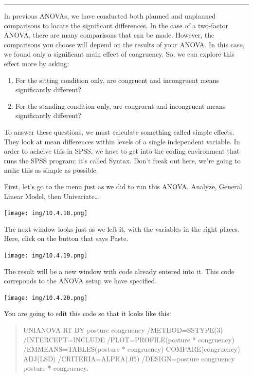 \documentclass[]{book}
\providecommand{\tightlist}{%
  \setlength{\itemsep}{0pt}\setlength{\parskip}{0pt}}
\begin{document}
\begin{center}\rule{0.5\linewidth}{0.5pt}\end{center}

In previous ANOVAs, we have conducted both planned and unplanned
comparisons to locate the significant differences. In the case of a
two-factor ANOVA, there are many comparisons that can be made. However,
the comparisons you choose will depend on the results of your ANOVA. In
this case, we found only a significant main effect of congruency. So, we
can explore this effect more by asking:

\begin{enumerate}
\def\labelenumi{\arabic{enumi}.}
\tightlist
\item
  For the sitting condition only, are congruent and incongruent means
  significantly different?
\item
  For the standing condition only, are congruent and incongruent means
  significantly different?
\end{enumerate}

To answer these questions, we must calculate something called simple
effects. They look at mean differences within levels of a single
independent variable. In order to acheive this in SPSS, we have to get
into the coding environment that runs the SPSS program; it's called
Syntax. Don't freak out here, we're going to make this as simple as
possible.

First, let's go to the menu just as we did to run this ANOVA. {Analyze},
{General Linear Model}, then {Univariate\ldots{}}

\texttt{[image: img/10.4.18.png]}

The next window looks just as we left it, with the variables in the
right places. Here, click on the button that says {Paste}.

\texttt{[image: img/10.4.19.png]}

The result will be a new window with code already entered into it. This
code correponds to the ANOVA setup we have specified.

\texttt{[image: img/10.4.20.png]}

You are going to edit this code so that it looks like this:

\begin{quote}
UNIANOVA RT BY posture congruency /METHOD=SSTYPE(3) /INTERCEPT=INCLUDE
/PLOT=PROFILE(posture * congruency) /EMMEANS=TABLES(posture *
congruency) COMPARE(congruency) ADJ(LSD) /CRITERIA=ALPHA(.05)
/DESIGN=posture congruency posture * congruency.
\end{quote}
\end{document}
